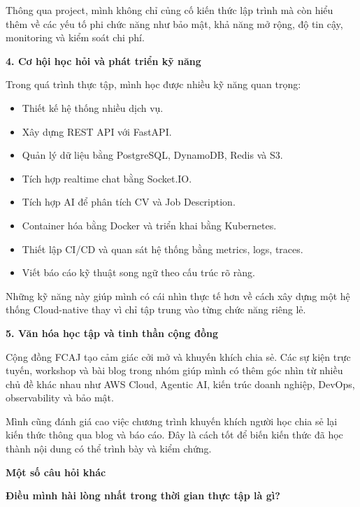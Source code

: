 Thông qua project, mình không chỉ củng cố kiến thức lập trình mà còn
hiểu thêm về các yếu tố phi chức năng như bảo mật, khả năng mở rộng, độ
tin cậy, monitoring và kiểm soát chi phí.

\vspace{0.5em}\noindent\textbf{4. Cơ hội học hỏi và phát triển kỹ
năng}\par

Trong quá trình thực tập, mình học được nhiều kỹ năng quan trọng:

\begin{itemize}
\tightlist
\item
  Thiết kế hệ thống nhiều dịch vụ.
\item
  Xây dựng REST API với FastAPI.
\item
  Quản lý dữ liệu bằng PostgreSQL, DynamoDB, Redis và S3.
\item
  Tích hợp realtime chat bằng Socket.IO.
\item
  Tích hợp AI để phân tích CV và Job Description.
\item
  Container hóa bằng Docker và triển khai bằng Kubernetes.
\item
  Thiết lập CI/CD và quan sát hệ thống bằng metrics, logs, traces.
\item
  Viết báo cáo kỹ thuật song ngữ theo cấu trúc rõ ràng.
\end{itemize}

Những kỹ năng này giúp mình có cái nhìn thực tế hơn về cách xây dựng một
hệ thống Cloud-native thay vì chỉ tập trung vào từng chức năng riêng lẻ.

\vspace{0.5em}\noindent\textbf{5. Văn hóa học tập và tinh thần cộng
đồng}\par

Cộng đồng FCAJ tạo cảm giác cởi mở và khuyến khích chia sẻ. Các sự kiện
trực tuyến, workshop và bài blog trong nhóm giúp mình có thêm góc nhìn
từ nhiều chủ đề khác nhau như AWS Cloud, Agentic AI, kiến trúc doanh
nghiệp, DevOps, observability và bảo mật.

Mình cũng đánh giá cao việc chương trình khuyến khích người học chia sẻ
lại kiến thức thông qua blog và báo cáo. Đây là cách tốt để biến kiến
thức đã học thành nội dung có thể trình bày và kiểm chứng.

\vspace{0.5em}\noindent\textbf{Một số câu hỏi
khác}\par

\vspace{0.5em}\noindent\textbf{Điều mình hài lòng nhất trong thời gian thực tập là
gì?}\par

